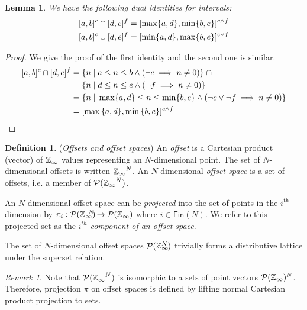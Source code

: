 \documentclass[acmlarge,review]{acmart}
\theoremstyle{definition}
\newtheorem{defn}{Definition}
\theoremstyle{plain}
\newtheorem{lem}{Lemma}
\theoremstyle{remark}
\newtheorem{remark}{Remark}
\begin{document}
\begin{lem}{}\label{lem:zinf-identities}
  We have the following dual identities for \zinf{} intervals:
%
  \begin{align*}
    \textnormal{$\lbrack a,b\rbrack^{c}$} \cap \textnormal{$\lbrack d,e\rbrack^{f}$} & =
      \textnormal{$\lbrack\max \{a,d\},\min \{b,e\}\rbrack^{c \wedge f}$} \\
    \textnormal{$\lbrack a,b\rbrack^{c}$} \cup \textnormal{$\lbrack d,e\rbrack^{f}$} & =
      \textnormal{$\lbrack\min \{a,d\},\max \{b,e\}\rbrack^{c \vee f}$}
  \end{align*}
\end{lem}
%
\begin{proof}
  We give the proof of the first identity and the second one is similar.
  \begin{align*}
    \textnormal{$\lbrack a,b\rbrack^{c}$} \cap \textnormal{$\lbrack d,e\rbrack^{f}$} = &
      \; \{ n \;|\; a \leq n \leq b \wedge (\neg c \implies n \neq 0) \}
      \;\cap \\
      & \; \{ n \;|\; d \leq n \leq e \wedge (\neg f \implies n \neq 0) \}
      \\
    = & \; \{ n \;|\; \max \{a,d\} \leq n \leq \min \{b,e\} \wedge (\neg c
      \vee \neg f \implies n \neq 0) \} \\
    = & \; \textnormal{$\lbrack\max{\{a,d\}},\min{\{b,e\}}\rbrack^{c \wedge f}$}
  \end{align*}
\end{proof}

\begin{defn}{(\emph{Offsets and offset spaces})}
  An \emph{offset} is a Cartesian product (vector) of $\textnormal{$\mathbb{Z}_\infty$}$ values representing an
  $N$-dimensional point. The set of $N$-dimensional offsets is
  written $\textnormal{$\mathbb{Z}_\infty$}^N$.  An $N$-dimensional \emph{offset space} is a set of
  offsets, i.e. a member of $\mathcal{P}(\textnormal{$\mathbb{Z}_\infty$}^N)$.

An $N$-dimensional offset space can be \emph{projected} into the set
of points in the $i^{\text{th}}$ dimension by $\pi_i : \mathcal{P}(\textnormal{$\mathbb{Z}_\infty$}{})^{\mkern-19mu{N}} \to
  \mathcal{P}(\textnormal{$\mathbb{Z}_\infty$}{})$ where $i \in \mathsf{Fin}(N)$. We refer to this projected set as the \emph{$i^{th}$
    component of an offset space}. 
\end{defn}

\begin{proposition}
The set of $N$-dimensional offset spaces
$\mathcal{P}{(\textnormal{$\mathbb{Z}_\infty$}{}^{\mkern-19mu{N}})}$ trivially forms a
  distributive lattice under the superset relation.
\end{proposition}

\begin{remark}
Note that $\mathcal{P}(\textnormal{$\mathbb{Z}_\infty$}^N)$ is isomorphic to a sets of point
vectors $\mathcal{P}(\textnormal{$\mathbb{Z}_\infty$})^N$. Therefore, projection $\pi$ on 
offset spaces is defined by lifting normal Cartesian product
projection to sets.
\end{remark}
\end{document}
